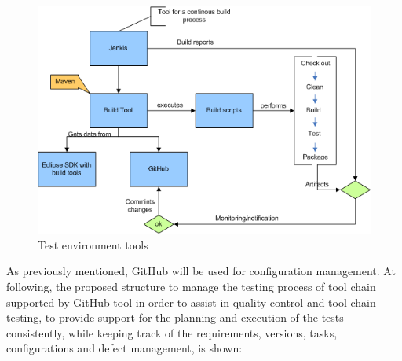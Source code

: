 \begin{figure}[H]
\includegraphics[width=\textwidth]{tools}
\caption{\label{fig:tools} Test environment tools} 
\end{figure}

As previously mentioned, GitHub will be used for configuration management. At following, the proposed structure to manage the testing process of tool chain supported by GitHub tool in order to assist in quality control and tool chain testing, to provide support for the planning and execution of the tests consistently, while keeping track of the requirements, versions, tasks, configurations and defect management, is shown:
 
